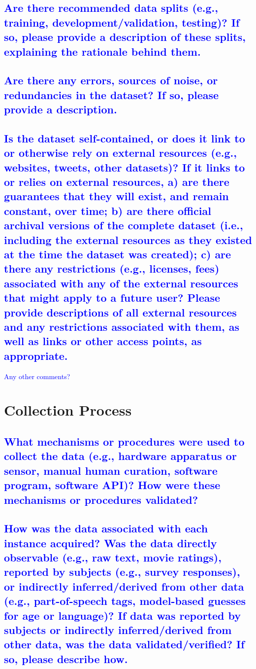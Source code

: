 \documentclass[letterpaper, 10 pt, conference]{ieeeconf}  %
\begin{document}
\textcolor{blue}{\subsection{Are there recommended data splits (e.g., training, development/validation, testing)? If so, please provide a description of these
splits, explaining the rationale behind them.}}
\lipsum[1]

\textcolor{blue}{\subsection{Are there any errors, sources of noise, or redundancies in the
dataset? If so, please provide a description.}}
\lipsum[1]

\textcolor{blue}{\subsection{Is the dataset self-contained, or does it link to or otherwise rely on
external resources (e.g., websites, tweets, other datasets)? If it links
to or relies on external resources, a) are there guarantees that they will
exist, and remain constant, over time; b) are there official archival versions
of the complete dataset (i.e., including the external resources as they existed at the time the dataset was created); c) are there any restrictions
(e.g., licenses, fees) associated with any of the external resources that
might apply to a future user? Please provide descriptions of all external
resources and any restrictions associated with them, as well as links or
other access points, as appropriate.}}
\lipsum[1]

\textcolor{blue}{Any other comments?}
\lipsum[1]

\section{Collection Process}

\textcolor{blue}{\subsection{What mechanisms or procedures were used to collect the data (e.g.,
hardware apparatus or sensor, manual human curation, software program, software API)? How were these mechanisms or procedures validated?}}
\lipsum[1]

\textcolor{blue}{\subsection{How was the data associated with each instance acquired? Was the
data directly observable (e.g., raw text, movie ratings), reported by subjects (e.g., survey responses), or indirectly inferred/derived from other data
(e.g., part-of-speech tags, model-based guesses for age or language)?
If data was reported by subjects or indirectly inferred/derived from other
data, was the data validated/verified? If so, please describe how.}}
\lipsum[1]
\end{document}
